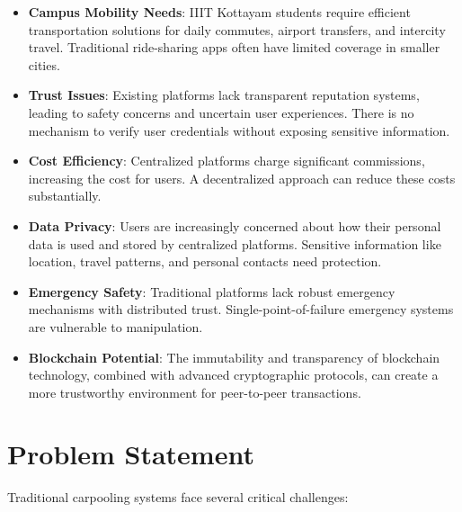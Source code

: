 \begin{itemize}
    \item \textbf{Campus Mobility Needs}: IIIT Kottayam students require efficient transportation solutions for daily commutes, airport transfers, and intercity travel. Traditional ride-sharing apps often have limited coverage in smaller cities.
    
    \item \textbf{Trust Issues}: Existing platforms lack transparent reputation systems, leading to safety concerns and uncertain user experiences. There is no mechanism to verify user credentials without exposing sensitive information.
    
    \item \textbf{Cost Efficiency}: Centralized platforms charge significant commissions, increasing the cost for users. A decentralized approach can reduce these costs substantially.
    
    \item \textbf{Data Privacy}: Users are increasingly concerned about how their personal data is used and stored by centralized platforms. Sensitive information like location, travel patterns, and personal contacts need protection.
    
    \item \textbf{Emergency Safety}: Traditional platforms lack robust emergency mechanisms with distributed trust. Single-point-of-failure emergency systems are vulnerable to manipulation.
    
    \item \textbf{Blockchain Potential}: The immutability and transparency of blockchain technology, combined with advanced cryptographic protocols, can create a more trustworthy environment for peer-to-peer transactions.
\end{itemize}

\section{Problem Statement}

Traditional carpooling systems face several critical challenges:


